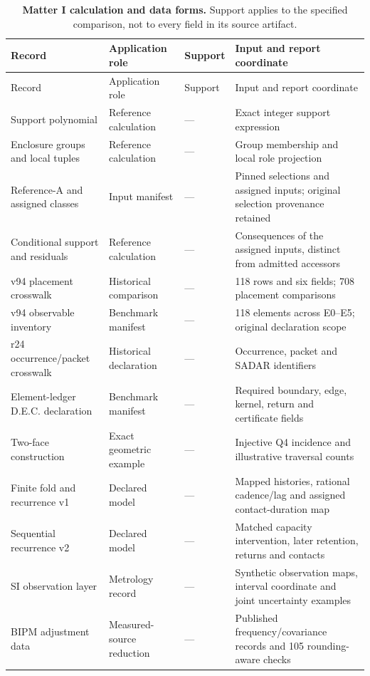 {\small
\begin{longtable}{@{}p{}p{}p{}p{}@{}}
\caption{\textbf{Matter I calculation and data forms.} Support applies to the
specified comparison, not to every field in its source artifact.}
\label{tab:manual2-prediction-test-registry}\\
\toprule
Record & Application role & Support & Input and report coordinate\\
\midrule
\endfirsthead
\toprule
Record & Application role & Support & Input and report coordinate\\
\midrule
\endhead
Support polynomial & Reference calculation & --- & Exact integer support expression\\
Enclosure groups and local tuples & Reference calculation & --- & Group membership and local role projection\\
Reference-A and assigned classes & Input manifest & --- & Pinned selections and assigned inputs; original selection provenance retained\\
Conditional support and residuals & Reference calculation & --- & Consequences of the assigned inputs, distinct from admitted accessors\\
v94 placement crosswalk & Historical comparison & --- & 118 rows and six fields; 708 placement comparisons\\
v94 observable inventory & Benchmark manifest & --- & 118 elements across E0--E5; original declaration scope\\
r24 occurrence/packet crosswalk & Historical declaration & --- & Occurrence, packet and SADAR identifiers\\
Element-ledger D.E.C. declaration & Benchmark manifest & --- & Required boundary, edge, kernel, return and certificate fields\\
Two-face construction & Exact geometric example & --- & Injective Q4 incidence and illustrative traversal counts\\
Finite fold and recurrence v1 & Declared model & --- & Mapped histories, rational cadence/lag and assigned contact-duration map\\
Sequential recurrence v2 & Declared model & --- & Matched capacity intervention, later retention, returns and contacts\\
SI observation layer & Metrology record & --- & Synthetic observation maps, interval coordinate and joint uncertainty examples\\
BIPM adjustment data & Measured-source reduction & --- & Published frequency/covariance records and 105 rounding-aware checks\\

\end{longtable}}
